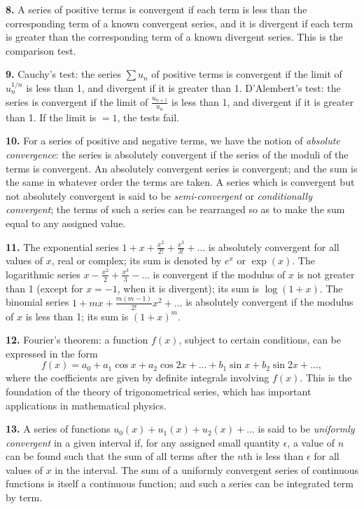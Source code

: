 \documentclass[11pt,a4paper]{book}
\begin{document}
\textbf{8.}\quad
A series of positive terms is convergent if each term is less than the corresponding term of a known convergent series, and it is divergent if each term is greater than the corresponding term of a known divergent series. This is the comparison test.

\textbf{9.}\quad
Cauchy's test: the series $\sum u_{n}$ of positive terms is convergent if the limit of $u_{n}^{1/n}$ is less than 1, and divergent if it is greater than 1. D'Alembert's test: the series is convergent if the limit of $\frac{u_{n+1}}{u_{n}}$ is less than 1, and divergent if it is greater than 1. If the limit is $= 1$, the tests fail.

\textbf{10.}\quad
For a series of positive and negative terms, we have the notion of \textit{absolute convergence}: the series is absolutely convergent if the series of the moduli of the terms is convergent. An absolutely convergent series is convergent; and the sum is the same in whatever order the terms are taken. A series which is convergent but not absolutely convergent is said to be \textit{semi-convergent} or \textit{conditionally convergent}; the terms of such a series can be rearranged so as to make the sum equal to any assigned value.

\textbf{11.}\quad
The exponential series $1 + x + \frac{x^{2}}{2!} + \frac{x^{3}}{3!} + \ldots$ is absolutely convergent for all values of $x$, real or complex; its sum is denoted by $e^{x}$ or $\exp(x)$. The logarithmic series $x - \frac{x^{2}}{2} + \frac{x^{3}}{3} - \ldots$ is convergent if the modulus of $x$ is not greater than 1 (except for $x = -1$, when it is divergent); its sum is $\log(1 + x)$. The binomial series $1 + mx + \frac{m(m-1)}{2!}x^{2} + \ldots$ is absolutely convergent if the modulus of $x$ is less than 1; its sum is $(1 + x)^{m}$.

\textbf{12.}\quad
Fourier's theorem: a function $f(x)$, subject to certain conditions, can be expressed in the form
\[
f(x) = a_{0} + a_{1}\cos x + a_{2}\cos 2x + \ldots + b_{1}\sin x + b_{2}\sin 2x + \ldots,
\]
where the coefficients are given by definite integrals involving $f(x)$. This is the foundation of the theory of trigonometrical series, which has important applications in mathematical physics.

\textbf{13.}\quad
A series of functions $u_{0}(x) + u_{1}(x) + u_{2}(x) + \ldots$ is said to be \textit{uniformly convergent} in a given interval if, for any assigned small quantity $\epsilon$, a value of $n$ can be found such that the sum of all terms after the $n$th is less than $\epsilon$ for all values of $x$ in the interval. The sum of a uniformly convergent series of continuous functions is itself a continuous function; and such a series can be integrated term by term.
\end{document}
